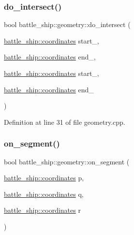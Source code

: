 \subsubsection{\texorpdfstring{do\+\_\+intersect()}{do\_intersect()}}
{\footnotesize\ttfamily bool battle\+\_\+ship\+::geometry\+::do\+\_\+intersect (\begin{DoxyParamCaption}\item[{\hyperlink{structbattle__ship_1_1coordinates}{battle\+\_\+ship\+::coordinates}}]{start\+\_,  }\item[{\hyperlink{structbattle__ship_1_1coordinates}{battle\+\_\+ship\+::coordinates}}]{end\+\_,  }\item[{\hyperlink{structbattle__ship_1_1coordinates}{battle\+\_\+ship\+::coordinates}}]{start\+\_,  }\item[{\hyperlink{structbattle__ship_1_1coordinates}{battle\+\_\+ship\+::coordinates}}]{end\+\_ }\end{DoxyParamCaption})\hspace{0.3cm}{\ttfamily [static]}}



Definition at line 31 of file geometry.\+cpp.

\mbox{\label{classbattle__ship_1_1geometry_ac6ab7fe7ccaeca7e7c0df8c0ebdbbce4}} 
\subsubsection{\texorpdfstring{on\+\_\+segment()}{on\_segment()}}
{\footnotesize\ttfamily bool battle\+\_\+ship\+::geometry\+::on\+\_\+segment (\begin{DoxyParamCaption}\item[{\hyperlink{structbattle__ship_1_1coordinates}{battle\+\_\+ship\+::coordinates}}]{p,  }\item[{\hyperlink{structbattle__ship_1_1coordinates}{battle\+\_\+ship\+::coordinates}}]{q,  }\item[{\hyperlink{structbattle__ship_1_1coordinates}{battle\+\_\+ship\+::coordinates}}]{r }\end{DoxyParamCaption})\hspace{0.3cm}{\ttfamily [static]}}



